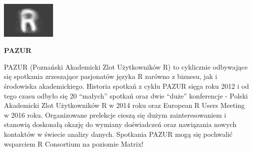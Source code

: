 \documentclass[\main/boa.tex]{subfiles}
\begin{document}
	
	\begin{minipage}[t]{0.915\textwidth}
		\center     
		\includegraphics[width=100px]{img/logos.bw/pazur.png} 
	\end{minipage}
	
	\Large \textbf {PAZUR}
	
	
	\vskip 0.3cm
	\normalsize 
	PAZUR (Poznański Akademicki Zlot Użytkowników R) to cyklicznie odbywające się spotkania zrzeszające pasjonatów języka R zarówno z biznesu, jak i środowiska akademickiego.
	Historia spotkań z cyklu PAZUR sięga roku 2012 i od tego czasu odbyło się 20 “małych” spotkań oraz dwie “duże” konferencje - Polski Akademicki Zlot Użytkowników R w 2014 roku oraz European R Users Meeting w 2016 roku. Organizowane prelekcje cieszą się dużym zainteresowaniem i stanowią doskonałą okazję do wymiany doświadczeń oraz nawiązania nowych kontaktów w świecie analizy danych. Spotkania PAZUR mogą się pochwalić wsparciem R Consortium na poziomie Matrix!
	
\end{document}

